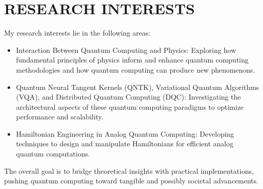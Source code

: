 \documentclass[11pt,a4paper]{article}
\begin{document}
\section*{RESEARCH INTERESTS}

My research interests lie in the following areas: 
\begin{itemize}
    \item Interaction Between Quantum Computing and Physics: Exploring how fundamental principles of physics inform and enhance quantum computing methodologies and how quantum computing can produce new phenomenons.
    \item Quantum Neural Tangent Kernels (QNTK), Variational Quantum Algorithms (VQA), and Distributed Quantum Computing (DQC): Investigating the architectural aspects of these quantum computing paradigms to optimize performance and scalability.
    \item Hamiltonian Engineering in Analog Quantum Computing: Developing techniques to design and manipulate Hamiltonians for efficient analog quantum computations.
    
\end{itemize}
The overall goal is to bridge theoretical insights with practical implementations, pushing quantum computing toward tangible and possibly societal advancements.




\end{document}
